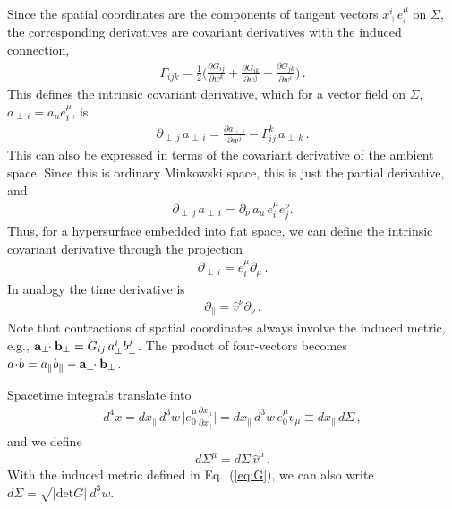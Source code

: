 \documentclass[reprint,superscriptaddress,english,preprintnumbers,amsmath,amssymb,aps,prx]{revtex4-2}
\def\det{{\mathrm{det}}}
\def\Eq#1{Eq.~(\ref{#1})}
\begin{document}
Since the spatial coordinates are the components of tangent vectors $x_\perp^i e_i^\mu$ on $\Sigma$, the corresponding derivatives are covariant derivatives with the induced connection,
\begin{align}
\Gamma_{ijk} = \frac{1}{2}\Bigg( \frac{\partial G_{ij}}{\partial w^k}  + \frac{\partial G_{ik}}{\partial w^j} -\frac{\partial G_{jk}}{\partial w^i}  \Bigg)\,.
\end{align}
This defines the intrinsic covariant derivative, which for a vector field on $\Sigma$, $a_{\perp\, i} = a_\mu e^\mu_i$, is
\begin{align}
\partial_{\perp\,j}\, a_{\perp\, i} = \frac{\partial a_{\perp\,i}}{\partial w^j} - \Gamma^k_{ij}\, a_{\perp\, k}\,.
\end{align}
This can also be expressed in terms of the covariant derivative of the ambient space. Since this is ordinary Minkowski space, this is just the partial derivative, and
\begin{align}
\partial_{\perp\,j}\, a_{\perp\, i} = \partial_\nu\, a_\mu\, e^\mu_i e^\nu_j.
\end{align}
Thus, for a hypersurface embedded into flat space, we can define the intrinsic covariant derivative through the projection
\begin{align}
\partial_{\perp\,i}=e_i^\mu \partial_\mu\,.
\end{align}
In analogy the time derivative is
\begin{align}
\partial_\parallel = \hat v^\nu \partial_\nu\,.
\end{align}
Note that contractions of spatial coordinates always involve the induced metric, e.g., $\bold{a}_\perp\!\!\cdot\bold{b}_\perp = G_{ij}\, a_\perp^i b_\perp^j$. The product of four-vectors becomes $a\!\cdot\!b = a_\parallel b_\parallel - \bold{a}_\perp\!\!\cdot\bold{b}_\perp$.

Spacetime integrals translate into
\begin{align}
d^4x = dx_\parallel\, d^3w\, \bigg| e_0^\mu\frac{\partial x_\mu}{\partial x_\parallel}\bigg| = dx_\parallel\,d^3w\, e_0^\mu\hat v_\mu
\equiv dx_\parallel\, d\Sigma\,, 
\end{align}
and we define
\begin{align}
d\Sigma^\mu = d\Sigma\, \hat v^\mu\,.
\end{align}
With the induced metric defined in \Eq{eq:G}, we can also write $d\Sigma = \sqrt{|\det G|}\, d^3w$.
\end{document}
